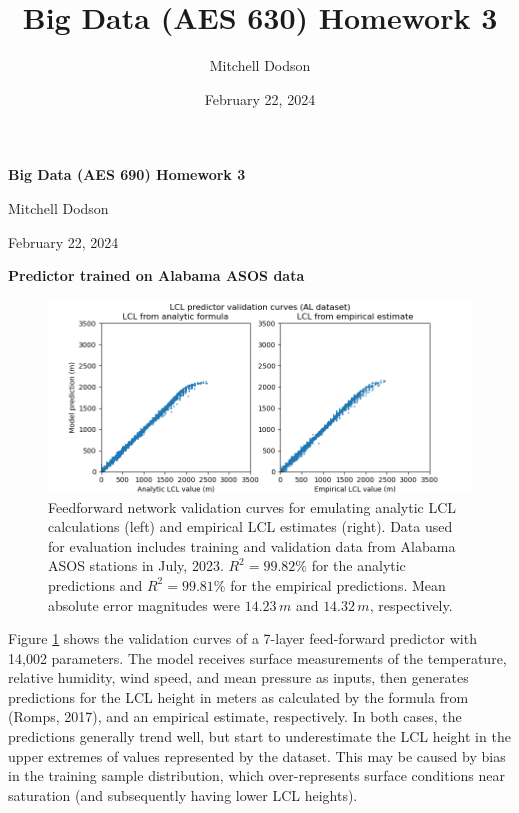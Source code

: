 \documentclass[11pt]{article}
\title{Big Data (AES 630) Homework 3}
\author{Mitchell Dodson}
\date{February 22, 2024}
\begin{document}
\noindent
{\Large\textbf{Big Data (AES 690) Homework 3}}

\noindent
\large{Mitchell Dodson}

\noindent
\large{February 22, 2024}

\vspace{1em}
\noindent
{\Large\textbf{Predictor trained on Alabama ASOS data}}

\begin{figure}[h!]
    \centering

    \includegraphics[width=.6\paperwidth]{figs/val_ff-rand-014_al.png}

    \caption{Feedforward network validation curves for emulating analytic LCL calculations (left) and empirical LCL estimates (right). Data used for evaluation includes training and validation data from Alabama ASOS stations in July, 2023. $R^2=99.82\%$ for the analytic predictions and $R^2=99.81\%$ for the empirical predictions. Mean absolute error magnitudes were $14.23\,\si{m}$ and $14.32\,\si{m}$, respectively.}
    \label{f1}
\end{figure}

Figure \ref{f1} shows the validation curves of a 7-layer feed-forward predictor with 14,002 parameters. The model receives surface measurements of the temperature, relative humidity, wind speed, and mean pressure as inputs, then generates predictions for the LCL height in meters as calculated by the formula from (Romps, 2017), and an empirical estimate, respectively. In both cases, the predictions generally trend well, but start to underestimate the LCL height in the upper extremes of values represented by the dataset. This may be caused by bias in the training sample distribution, which over-represents surface conditions near saturation (and subsequently having lower LCL heights).
\end{document}
